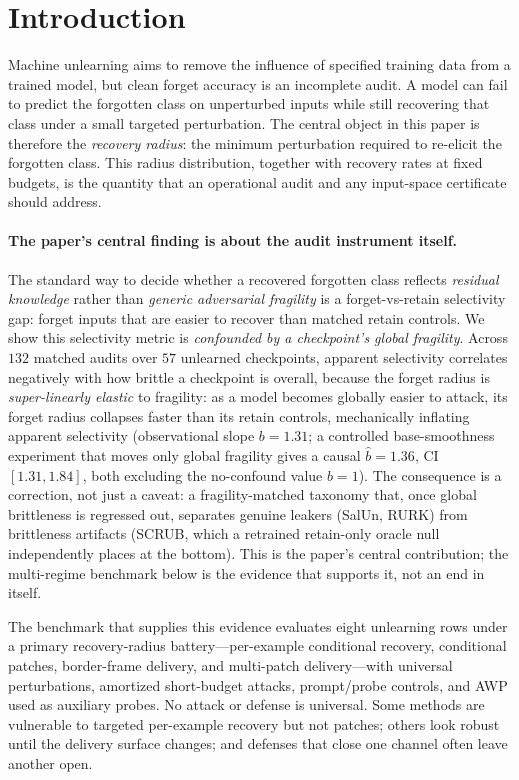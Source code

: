 \documentclass{article}
\begin{document}
\section{Introduction}
Machine unlearning aims to remove the influence of specified training data from a trained model, but clean forget accuracy is an incomplete audit. A model can fail to predict the forgotten class on unperturbed inputs while still recovering that class under a small targeted perturbation. The central object in this paper is therefore the \emph{recovery radius}: the minimum perturbation required to re-elicit the forgotten class. This radius distribution, together with recovery rates at fixed budgets, is the quantity that an operational audit and any input-space certificate should address.

\paragraph{The paper's central finding is about the audit instrument itself.} The standard way to decide whether a recovered forgotten class reflects \emph{residual knowledge} rather than \emph{generic adversarial fragility} is a forget-vs-retain selectivity gap: forget inputs that are easier to recover than matched retain controls. We show this selectivity metric is \emph{confounded by a checkpoint's global fragility}. Across $132$ matched audits over $57$ unlearned checkpoints, apparent selectivity correlates negatively with how brittle a checkpoint is overall, because the forget radius is \emph{super-linearly elastic} to fragility: as a model becomes globally easier to attack, its forget radius collapses faster than its retain controls, mechanically inflating apparent selectivity (observational slope $b{=}1.31$; a controlled base-smoothness experiment that moves only global fragility gives a causal $\hat b{=}1.36$, CI $[1.31,1.84]$, both excluding the no-confound value $b{=}1$). The consequence is a correction, not just a caveat: a fragility-matched taxonomy that, once global brittleness is regressed out, separates genuine leakers (SalUn, RURK) from brittleness artifacts (SCRUB, which a retrained retain-only oracle null independently places at the bottom). This is the paper's central contribution; the multi-regime benchmark below is the evidence that supports it, not an end in itself.

The benchmark that supplies this evidence evaluates eight unlearning rows under a primary recovery-radius battery---per-example conditional recovery, conditional patches, border-frame delivery, and multi-patch delivery---with universal perturbations, amortized short-budget attacks, prompt/probe controls, and AWP used as auxiliary probes. No attack or defense is universal. Some methods are vulnerable to targeted per-example recovery but not patches; others look robust until the delivery surface changes; and defenses that close one channel often leave another open.
\end{document}
